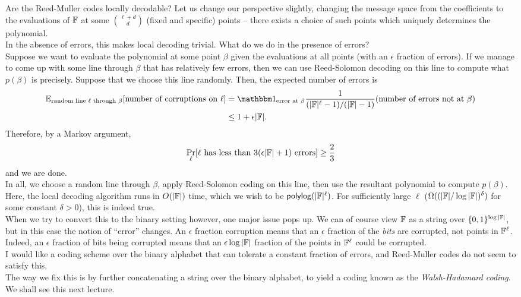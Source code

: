 		Are the Reed-Muller codes locally decodable? Let us change our perspective slightly, changing the message space from the coefficients to the evaluations of $\mathbb{F}$ at some $\binom{\ell+d}{d}$ (fixed and specific) points -- there exists a choice of such points which uniquely determines the polynomial.\\
		In the absence of errors, this makes local decoding trivial. What do we do in the presence of errors?\\
		Suppose we want to evaluate the polynomial at some point $\beta$ given the evaluations at all points (with an $\epsilon$ fraction of errors). If we manage to come up with some line through $\beta$ that has relatively few errors, then we can use Reed-Solomon decoding on this line to compute what $p(\beta)$ is precisely. Suppose that we choose this line randomly. Then, the expected number of errors is
		\begin{align*}
			\E_{\text{random line $\ell$ through $\beta$}}[\text{number of corruptions on $\ell$}] &= \indic_{\text{error at $\beta$}} \frac{1}{(|\F|^\ell-1)/(|\F|-1)} (\text{number of errors not at $\beta$}) \\
				&\le 1 + \epsilon|\F|.
		\end{align*}
		Therefore, by a Markov argument,
		\[ \Pr_{\ell} [\text{$\ell$ has less than $3(\epsilon|\mathbb{F}|+1)$ errors}] \ge \frac{2}{3} \]
		and we are done.\\

		In all, we choose a random line through $\beta$, apply Reed-Solomon coding on this line, then use the resultant polynomial to compute $p(\beta)$.\\
		Here, the local decoding algorithm runs in $O(|\mathbb{F}|)$ time, which we wish to be $\mathsf{polylog}(|\mathbb{F}|^{\ell})$. For sufficiently large $\ell$ ($\Omega( (|\mathbb{F}|/\log|\mathbb{F}|)^\delta)$ for some constant $\delta > 0$), this is indeed true.\\

		When we try to convert this to the binary setting however, one major issue pops up. We can of course view $\mathbb{F}$ as a string over $\{0,1\}^{\log |\mathbb{F}|}$, but in this case the notion of ``error'' changes. An $\epsilon$ fraction corruption means that an $\epsilon$ fraction of the \emph{bits} are corrupted, not points in $\mathbb{F}^\ell$. Indeed, an $\epsilon$ fraction of bits being corrupted means that an $\epsilon \log|\mathbb{F}|$ fraction of the points in $\mathbb{F}^\ell$ could be corrupted. \\
		I would like a coding scheme over the binary alphabet that can tolerate a constant fraction of errors, and Reed-Muller codes do not seem to satisfy this.\\
		The way we fix this is by further concatenating a string over the binary alphabet, to yield a coding known as the \emph{Walsh-Hadamard coding}. We shall see this next lecture.